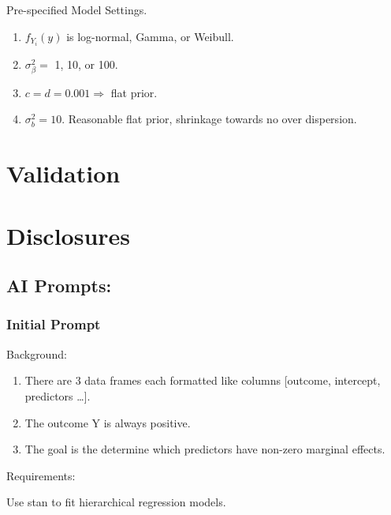 \documentclass[
  letterpaper,
]{article}
\begin{document}
Pre-specified Model Settings.

\begin{enumerate}
\def\labelenumi{\arabic{enumi}.}
\item
  \(f_{Y_i}(y)\) is log-normal, Gamma, or Weibull.
\item
  \(\sigma^2_\beta=\) 1, 10, or 100.
\item
  \(c = d = 0.001 \Rightarrow\) flat prior.
\item
  \(\sigma^2_b = 10\). Reasonable flat prior, shrinkage towards no over
  dispersion.
\end{enumerate}

\section{Validation}\label{validation}

\pagebreak

\section{Disclosures}\label{disclosures}

\subsection{AI Prompts:}\label{ai-prompts}

\subsubsection{Initial Prompt}\label{initial-prompt}

Background:

\begin{enumerate}
\def\labelenumi{\arabic{enumi}.}
\item
  There are 3 data frames each formatted like columns {[}outcome,
  intercept, predictors \ldots{]}.
\item
  The outcome Y is always positive.
\item
  The goal is the determine which predictors have non-zero marginal
  effects.
\end{enumerate}

Requirements:

Use stan to fit hierarchical regression models.
\end{document}
